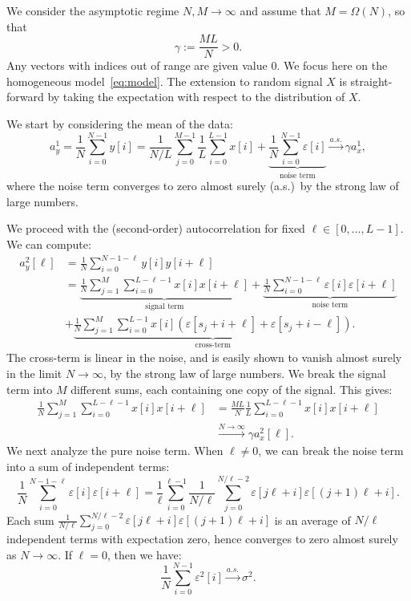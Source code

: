 \documentclass[12pt]{article}
\newcommand{\1}{\mathbf{1}}
\theoremstyle{plain}
\theoremstyle{definition}
\theoremstyle{remark}
\theoremstyle{plain}
\theoremstyle{remark}
\theoremstyle{plain}
\theoremstyle{plain}
\theoremstyle{plain}
\numberwithin{equation}{section}
\begin{document}
We consider the asymptotic regime $N,M\to\infty$ and assume that $M=\Omega(N)$, so that
\begin{equation*}
\gamma := \frac{ML}{N}>0.
\end{equation*}
%
Any vectors with indices out of range are given value 0.
We focus here on the homogeneous model~\eqref{eq:model}. The extension to random signal $X$ is straight-forward by taking the expectation with respect to the distribution of $X$.

We start by considering the mean of the data:
\begin{equation*}
a_y^1 = \frac{1}{N}\sum_{i=0}^{N-1} y[i] =
\frac{1}{N/L}\sum_{j=0}^{M-1}\frac{1}{L}\sum_{i=0}^{L-1}x[i] +    
\underbrace{\frac{1}{N}\sum_{i=0}^{N-1}\varepsilon[i]}_{\text{noise term}}
\xrightarrow{a.s.}\gamma a_x^1,
\end{equation*}
%
where the noise term converges to zero almost surely (a.s.)\ by the strong law of large numbers.

We proceed with the (second-order) autocorrelation for fixed $\ell\in[0,\ldots,L-1]$. We can compute:
%
\begin{align*}
%
a_y^2[\ell] & = \frac{1}{N}\sum_{i=0}^{N-1-\ell}y[i]y[i+\ell]
\nonumber \\
& = \underbrace{\frac{1}{N}\sum_{j=1}^{M}\sum_{i=0}^{L-\ell-1}x[i]x[i+\ell]}_{\text{signal term}} + \underbrace{\frac{1}{N}\sum_{i=0}^{N-1-\ell}\varepsilon[i]\varepsilon[i+\ell]}_{\text{noise term}}
\\ & + \underbrace{\frac{1}{N} \sum_{j=1}^{M} \sum_{i=0}^{L-1} x[i] (\varepsilon[s_j + i + \ell] + \varepsilon[s_j + i - \ell])}_{\text{cross-term}}. 
%
\end{align*}
The cross-term is linear in the noise, and is easily shown to vanish almost surely in the limit $N\to\infty$, by the strong law of large numbers. We break the signal term into $M$ different sums, each containing one copy of the signal. This gives:
%
\begin{align} \label{eq:2nd_moment_signal_term}
%
\frac{1}{N}\sum_{j=1}^{M}\sum_{i=0}^{L-\ell-1}x[i]x[i+\ell] & = \frac{ML}{N}\frac{1}{L}\sum_{i=0}^{L-\ell-1}x[i]x[i+\ell]\nonumber\\&\xrightarrow{N\to\infty}\gamma a_x^2[\ell].
%
\end{align}
%
We next analyze the pure noise term. When $\ell\neq 0$, we can break the noise term into a sum of independent terms:
%
\begin{equation*}
%
\frac{1}{N}\sum_{i=0}^{N-1-\ell} \varepsilon[i]\varepsilon[i+\ell] = \frac{1}{\ell}\sum_{i=0}^{\ell-1}\frac{1}{N/\ell}\sum_{j=0}^{N/\ell -2} \varepsilon[j\ell + i] \varepsilon[(j+1)\ell + i].
%
\end{equation*}
%
Each sum $\frac{1}{N/\ell}\sum_{j=0}^{N/\ell -2} \varepsilon[j\ell + i] \varepsilon[(j+1)\ell + i]$ is an average of $N/\ell$ independent terms with expectation zero, hence converges to zero almost surely as $N\to\infty$. If $\ell=0$, then we have:
%
\begin{equation*}
\frac{1}{N}\sum_{i=0}^{N-1} \varepsilon^2[i] \xrightarrow{a.s.} \sigma^2.
\end{equation*}
\end{document}

